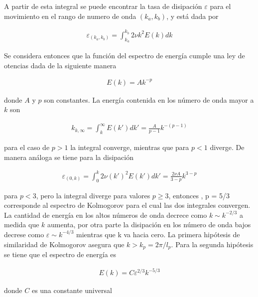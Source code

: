 \noindent A partir de esta integral se puede encontrar la tasa de disipación \cite{pope} $\varepsilon$ para el movimiento en el rango de numero de onda $(k_{a},k_{b})$, y está dada por 

\begin{eqnarray}
\varepsilon_{(k_{a},k_{b})} = \int_{k_{a}}^{k_{b}}2\nu k^{2}E(k)dk
\end{eqnarray}

\noindent Se considera entonces que la función del espectro de energía  cumple una ley de otencias dada de la siguiente manera

\begin{eqnarray}
E(k) = Ak^{-p}
\end{eqnarray}

\noindent donde $A$ y $p$ son constantes. La energía contenida en los número de onda mayor a $k$ son 

\begin{eqnarray}
k_{k,\infty} = \int_{k}^{\infty}E(k')dk' =\frac{A}{p-1}k^{-(p-1)}
\end{eqnarray}

\noindent para el caso de $p>1$ la integral converge, mientras que para $p<1$ diverge. De manera análoga se tiene para la disipación 

\begin{eqnarray}
\varepsilon_{(0,k)}= \int_{0}^{k}2\nu (k')^{2}E(k')dk'=\frac{2\nu A}{3-p}k^{3-p}
\end{eqnarray}

\noindent para $p<3$, pero la integral diverge para valores $p\geq 3$, entonces , p = 5/3 corresponde al espectro de Kolmogorov para el cual las dos integrales convergen. La cantidad de energía en los altos números de onda decrece como $k\sim k^{-2/3}$ a medida que $k$ aumenta, por otra parte la disipación en los número de onda bajos decrese como $\varepsilon \sim k^{-4/3}$ mientras que k va hacia cero. La primera hipótesis de similaridad de Kolmogorov asegura que $k>k_{p} = 2\pi/l_{p}$. Para la segunda hipótesis se tiene que el espectro de energía es

\begin{eqnarray}
E(k) = C\varepsilon^{2/3}k^{-5/3}
\end{eqnarray}

\noindent donde $C$ es una constante universal


